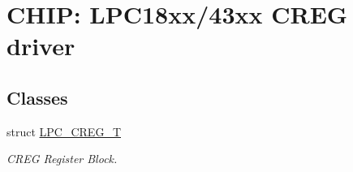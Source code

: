 \hypertarget{group___c_r_e_g__18_x_x__43_x_x}{}\section{C\+H\+IP\+: L\+P\+C18xx/43xx C\+R\+EG driver}
\label{group___c_r_e_g__18_x_x__43_x_x}
\subsection*{Classes}
\begin{DoxyCompactItemize}
\item 
struct \hyperlink{struct_l_p_c___c_r_e_g___t}{L\+P\+C\+\_\+\+C\+R\+E\+G\+\_\+T}
\begin{DoxyCompactList}\small\item\em C\+R\+EG Register Block. \end{DoxyCompactList}\end{DoxyCompactItemize}
